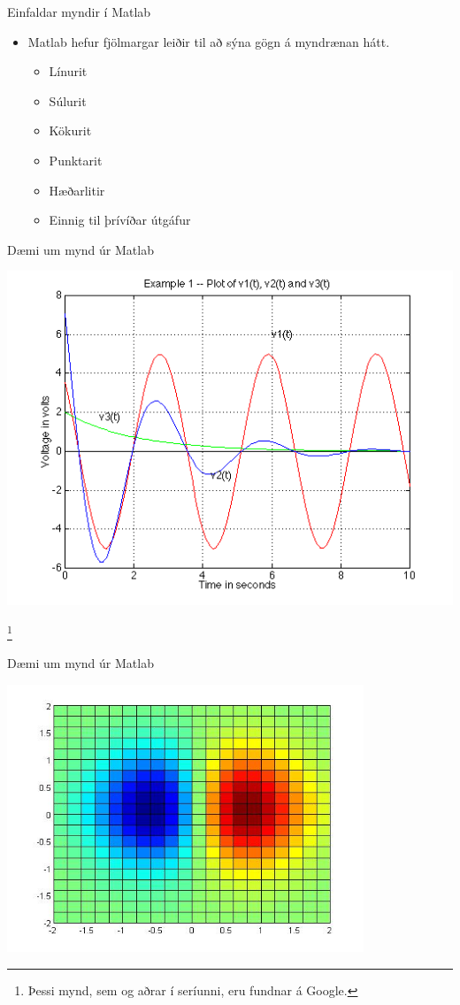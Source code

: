 \documentclass{beamer}
\begin{document}
\begin{frame}{Einfaldar myndir í Matlab}
\begin{itemize}
 \item Matlab hefur fjölmargar leiðir til að sýna gögn á myndrænan hátt.
 \begin{itemize}
  \item Línurit
  \item Súlurit
  \item Kökurit
  \item Punktarit
  \item Hæðarlitir
  \item Einnig til þrívíðar útgáfur
 \end{itemize}
\end{itemize}
\end{frame}

\begin{frame}{Dæmi um mynd úr Matlab}
\vspace{2\baselineskip}
\begin{center}
\includegraphics[height=0.6\textheight]{Pics/plot-example1}
\end{center}\footnote{Þessi mynd, sem og aðrar í seríunni, eru fundnar á Google.}
\end{frame}

\begin{frame}{Dæmi um mynd úr Matlab}
\begin{center}
\includegraphics[width=0.8\textwidth]{Pics/plot-example2}
\end{center}
\end{frame}
\end{document}
